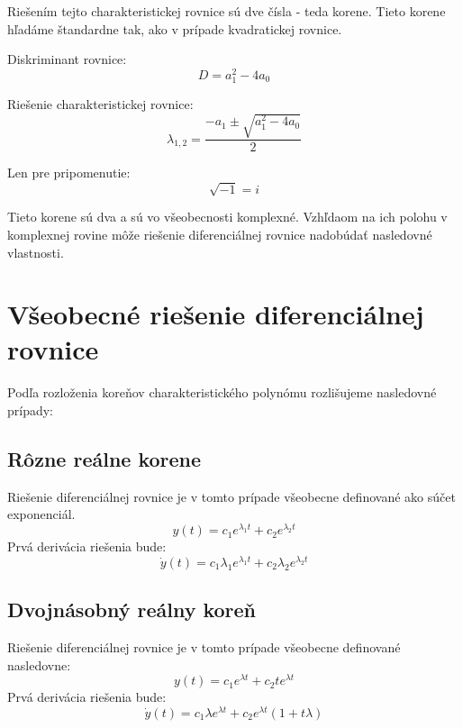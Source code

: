 \documentclass[a4paper,10pt]{article}
\begin{document}
Riešením tejto charakteristickej rovnice sú dve čísla - teda korene.
Tieto korene hľadáme štandardne tak, ako v prípade kvadratickej rovnice.

Diskriminant rovnice: 
\begin{equation}
 D=a_1^2-4a_0
\end{equation}

Riešenie charakteristickej rovnice:
\label{eq:charakteristická rovnica riešenie}
\begin{equation}
 \lambda_{1,2}=\frac{-a_1\pm \sqrt{a_1^2-4a_0}}{2}
\end{equation}

Len pre pripomenutie:
\begin{equation*}
\sqrt{-1}=i
\end{equation*}

Tieto korene sú dva a sú vo všeobecnosti komplexné. 
Vzhľdaom na ich polohu v komplexnej rovine môže riešenie diferenciálnej rovnice nadobúdať nasledovné vlastnosti.

\section{Všeobecné riešenie diferenciálnej rovnice}
Podľa rozloženia koreňov charakteristického polynómu rozlišujeme nasledovné prípady:
\subsection{Rôzne reálne korene}
Riešenie diferenciálnej rovnice je v tomto prípade všeobecne definované ako súčet exponenciál.
\begin{equation}
\label{eq:riešenie reálne korene}
 y(t)=c_1e^{\lambda_1 t}+c_2e^{\lambda_2 t}
\end{equation}
Prvá derivácia riešenia bude:
\begin{equation}
\label{eq:diff riešenie reálne korene}
 \dot{y}(t)=c_1 \lambda_1 e^{\lambda_1 t}+c_2 \lambda_2 e^{\lambda_2 t}
\end{equation}


\subsection{Dvojnásobný reálny koreň}
Riešenie diferenciálnej rovnice je v tomto prípade všeobecne definované nasledovne:
\begin{equation}
\label{eq:riešenie dvojnásobný koreň}
  y(t)=c_1e^{\lambda t}+c_2 t e^{\lambda t}
\end{equation}
Prvá derivácia riešenia bude: 
\begin{equation}
\label{eq:diff riešenie dvojnásobný koreň}
 \dot{y}(t)=c_1 \lambda e^{\lambda t}+c_2e^{\lambda t} \left( 1+ t \lambda \right)
\end{equation}
\end{document}
